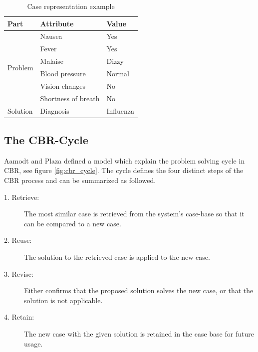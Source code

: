 \begin{table}[h]
\centering
\caption{Case representation example}
\label{tab:example_case}
\begin{tabular}{|l|l|l|}

\hline
 \textbf{Part} & \textbf{Attribute} & \textbf{Value} \\ \hline \hline
\multicolumn{1}{|l|}{\multirow{6}{*}{Problem}} & Nausea & Yes \\ \cline{2-3} 
\multicolumn{1}{|l|}{} & Fever & Yes \\ \cline{2-3} 
\multicolumn{1}{|l|}{} & Malaise & Dizzy \\ \cline{2-3} 
\multicolumn{1}{|l|}{} & Blood pressure & Normal \\ \cline{2-3} 
\multicolumn{1}{|l|}{} & Vision changes & No \\ \cline{2-3} 
\multicolumn{1}{|l|}{} & Shortness of breath & No \\ \hline
\multicolumn{1}{|l|}{Solution} & Diagnosis & Influenza \\ \hline
\end{tabular}
\end{table}

\subsection{The CBR-Cycle}\label{sec:cbr-cycle}

Aamodt and Plaza \cite{aamodt1994case} defined a model which explain the problem solving cycle in CBR, see figure \ref{fig:cbr_cycle}. The cycle defines the four distinct steps of the CBR process and can be summarized as followed.

\begin{description}
\item [1. Retrieve:] The most similar case is retrieved from the system's case-base so that it can be compared to a new case.
\item [2. Reuse:] The solution to the retrieved case is applied to the new case.
\item [3. Revise:] Either confirms that the proposed solution solves the new case, or that the solution is not applicable.
\item [4. Retain:] The new case with the given solution is retained in the case base for future usage.
\end{description}


